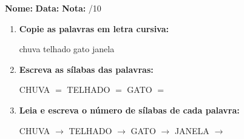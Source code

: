 \begin{exercicio}



\noindent\textbf{Nome:} \underline{\hspace{3.2cm}} \quad \textbf{Data:} \underline{\hspace{1.6cm}} \quad \textbf{Nota:} \underline{\hspace{0.9cm}}/10


\begin{enumerate}

  \item \textbf{Copie as palavras em letra cursiva:}
  \begin{center}
  chuva \quad telhado \quad gato \quad janela
  \end{center}
  \begin{center}
  \underline{\hspace{2.4cm}} \quad \underline{\hspace{2.4cm}} \quad \underline{\hspace{2.4cm}} \quad \underline{\hspace{2.4cm}}
  \end{center}

  \item \textbf{Escreva as sílabas das palavras:}
  \begin{center}
  CHUVA $=$ \underline{\hspace{1.5cm}} \underline{\hspace{1.5cm}} \quad TELHADO $=$ \underline{\hspace{1.5cm}} \underline{\hspace{1.5cm}} \quad GATO $=$ \underline{\hspace{1.5cm}} \underline{\hspace{1.5cm}}
  \end{center}

  \item \textbf{Leia e escreva o número de sílabas de cada palavra:}
  \begin{center}
  CHUVA $\rightarrow$ \underline{\hspace{0.9cm}} \quad TELHADO $\rightarrow$ \underline{\hspace{0.9cm}} \quad GATO $\rightarrow$ \underline{\hspace{0.9cm}} \quad JANELA $\rightarrow$ \underline{\hspace{0.9cm}}
  \end{center}


\end{enumerate}
\end{exercicio}
